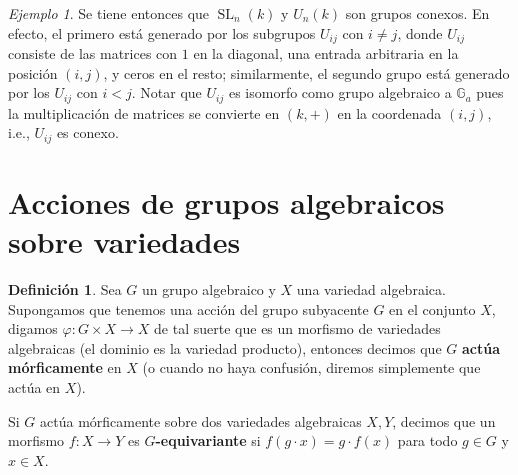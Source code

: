 \documentclass[spanish,10pt]{amsart}
\theoremstyle{definition}
\newtheorem{definition}[theorem]{Definición}
\theoremstyle{remark}
\newtheorem{example}[theorem]{Ejemplo}
\numberwithin{equation}{section}
\begin{document}
\begin{example}\label{ejemplo:SL y U son conexos}
Se tiene entonces que $\operatorname{SL}_n (k)$ y $U_n (k)$ son grupos conexos. En efecto, el primero está generado por los subgrupos $U_{ij}$ con $i \neq j$, donde $U_{ij}$ consiste de las matrices con $1$ en la diagonal, una entrada arbitraria en la posición $(i, j)$, y ceros en el resto; similarmente, el segundo grupo está generado por los $U_{ij}$ con $i < j$. Notar que $U_{ij}$ es isomorfo como grupo algebraico a $\mathbb{G}_a$ pues la multiplicación de matrices se convierte en $(k, +)$ en la coordenada $(i,j)$, i.e., $U_{ij}$ es conexo.
\end{example}


\section{Acciones de grupos algebraicos sobre variedades}

\begin{definition}
Sea $G$ un grupo algebraico y $X$ una variedad algebraica. Supongamos que tenemos una acción del grupo subyacente $G$ en el conjunto $X$, digamos $\varphi : G \times X \to X$ de tal suerte que es un morfismo de variedades algebraicas (el dominio es la variedad producto), entonces decimos que $G$ \textbf{actúa mórficamente} en $X$ (o cuando no haya confusión, diremos simplemente que actúa en $X$).

Si $G$ actúa mórficamente sobre dos variedades algebraicas $X,Y$, decimos que un morfismo $f : X \to Y$ es \textbf{$G$-equivariante} si $f(g \cdot x) = g \cdot f(x)$ para todo $g \in G$ y $x \in X$.
\end{definition}
\end{document}
